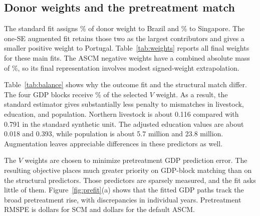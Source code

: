 \documentclass[12pt]{article}
\begin{document}
\subsection{Donor weights and the pretreatment match}
The standard fit assigns \BrazilWeight\% of donor weight to Brazil and \SingaporeWeight\% to Singapore. The one-SE augmented fit retains those two as the largest contributors and gives a smaller positive weight to Portugal. Table~\ref{tab:weights} reports all final weights for these main fits. The ASCM negative weights have a combined absolute mass of \ASCMNegativeMass\%, so its final representation involves modest signed-weight extrapolation.

\begin{table}[htbp]
\centering
\caption{Estimated donor weights}
\label{tab:weights}
\small

\end{table}

Table~\ref{tab:balance} shows why the outcome fit and the structural match differ. The four GDP blocks receive \GDPWeight\% of the selected $V$ weight. As a result, the standard estimator gives substantially less penalty to mismatches in livestock, education, and population. Northern livestock is about 0.116 compared with 0.791 in the standard synthetic unit. The adjusted education values are about 0.018 and 0.393, while population is about 5.7 million and 23.8 million. Augmentation leaves appreciable differences in these predictors as well.

The $V$ weights are chosen to minimize pretreatment GDP prediction error. The resulting objective places much greater priority on GDP-block matching than on the structural predictors. Those predictors are sparsely measured, and the fit asks little of them. Figure~\ref{fig:prefit}(a) shows that the fitted GDP paths track the broad pretreatment rise, with discrepancies in individual years. Pretreatment RMSPE is \SCMPreRMSPE{} dollars for SCM and \ASCMPreRMSPE{} dollars for the default ASCM.

\begin{table}[htbp]
\centering
\caption{Pretreatment predictor balance and standard SCM predictor weights}
\label{tab:balance}
\footnotesize
\setlength{\tabcolsep}{3.5pt}

\caption*{\footnotesize GDP entries are block averages in 2011 international dollars. Structural entries average the completed 1911--1943 series. ASCM uses the final signed weights under the one-SE penalty.}
\end{table}
\end{document}
